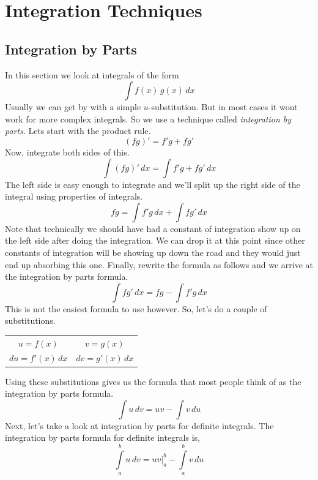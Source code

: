 \documentclass[10pt,reqno]{book}
\title{\myfont{Calculus II}}
\author{Lukas Zamora}
\date{December 2, 2017}
\theoremstyle{definition}
\begin{document}
	
	\maketitle
	
	\tableofcontents
	
	
	\chapter{Integration Techniques}
	
	
	\section{Integration by Parts}
	
	In this section we look at integrals of the form
	\[ \int f(x)\,g(x)\,dx \]
	Usually we can get by with a simple $ u $-substitution. But in most cases it wont work for more complex integrals. So we use a technique called \textit{integration by parts}. Lets start with the product rule.
	\[ (fg)' = f'g + fg' \]
	Now, integrate both sides of this.
	\[ \int (fg)'\,dx = \int f'g + fg'\,dx \]
	The left side is easy enough to integrate and we'll split up the right side of the integral using properties of integrals.
	\[ fg = \int f'g\,dx + \int fg'\,dx \]
	Note that technically we should have had a constant of integration show up on the left side after doing the integration. We can drop it at this point since other constants of integration will be showing up down the road and they would just end up absorbing this one. Finally, rewrite the formula as follows and we arrive at the integration by parts formula.
	\[ \int fg'\,dx = fg - \int f'g\,dx \]
	This is not the easiest formula to use however. So, let's do a couple of substitutions.
	\begin{center}
		\begin{tabular}{cc}
			$ u = f(x) $    &    $ v = g(x) $    \\
			$ du = f'(x)\,dx $ & $ dv = g'(x)\,dx $
		\end{tabular}	
	\end{center}
	Using these substitutions gives us the formula that most people think of as the integration by parts formula.
	\[ \int u\,dv = uv - \int v\,du \]
	Next, let's take a look at integration by parts for definite integrals. The integration by parts formula for definite integrals is,
	\[ \int\limits_{a}^{b} u\,dv = uv\Big|_{a}^{b} - \int\limits_{a}^b v\,du \]
	
\end{document}

